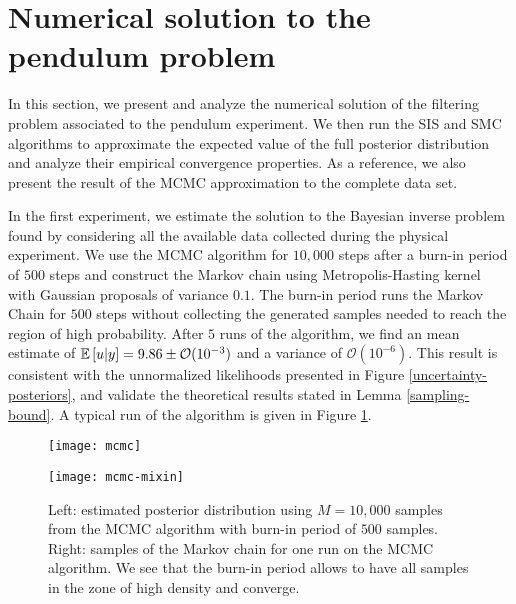 \section{Numerical solution to the pendulum problem}
In this section, we present and analyze the numerical solution of the filtering problem associated to the pendulum experiment. We then run the SIS and SMC algorithms to approximate the expected value of the full posterior distribution and analyze their empirical convergence properties. As a reference, we also present the result of the MCMC approximation to the complete data set.

In the first experiment, we estimate the solution to the Bayesian inverse problem found by considering all the available data collected during the physical experiment. We use the MCMC algorithm for $10,000$ steps after a burn-in period of $500$ steps and construct the Markov chain using Metropolis-Hasting kernel with Gaussian proposals of variance $0.1$. The burn-in period runs the Markov Chain for $500$ steps without collecting the generated samples needed to reach the region of high probability. After $5$ runs of the algorithm, we find an mean estimate of $\mathbb{E}\left[u|y\right] = 9.86 \pm \mathcal{O}(10^{-3})$ and a variance of $\mathcal{O}(10^{-6})$. This result is consistent with the unnormalized likelihoods presented in Figure \ref{uncertainty-posteriors}, and validate the theoretical results stated in Lemma \ref{sampling-bound}. A typical run of the algorithm is given in Figure \ref{mcmc-figure}.

\begin{figure}[!b]
  \label{mcmc-figure}
  \begin{minipage}{.43\textwidth}
    \texttt{[image: mcmc]}
  \end{minipage}
  \begin{minipage}{.5\textwidth}
    \texttt{[image: mcmc-mixin]}
  \end{minipage}
  \caption{Left: estimated posterior distribution using $M=10,000$ samples from the MCMC algorithm with burn-in period of $500$ samples. Right: samples of the Markov chain for one run on the MCMC algorithm. We see that the burn-in period allows to have all samples in the zone of high density and converge.}
\end{figure}

